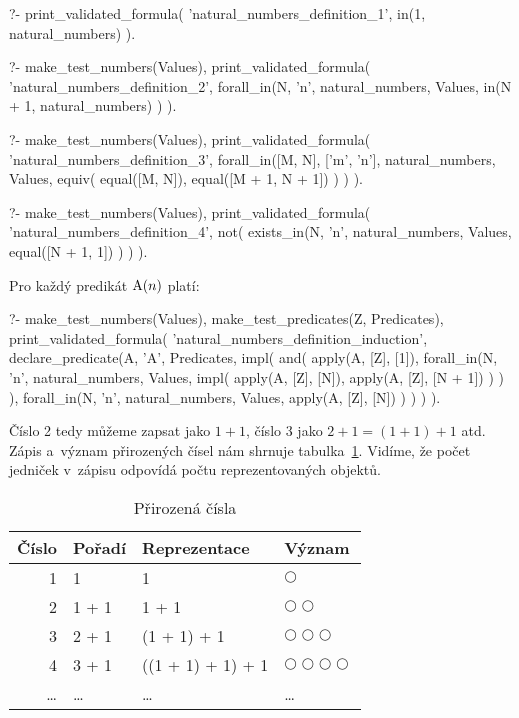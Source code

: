 \begin{fact}
\begin{prolog}
?-	print_validated_formula(
		'natural_numbers_definition_1',
		in(1, natural_numbers)
	).
\end{prolog}
\begin{prolog}
?-	make_test_numbers(Values),
	print_validated_formula(
		'natural_numbers_definition_2',
		forall_in(N, 'n', natural_numbers, Values,
				in(N + 1, natural_numbers)
		)
	).
\end{prolog}
\begin{prolog}
?-	make_test_numbers(Values),
	print_validated_formula(
		'natural_numbers_definition_3',
		forall_in([M, N], ['m', 'n'], natural_numbers, Values,
			equiv(
					equal([M, N]),
					equal([M + 1, N + 1])
			)
		)
	).
\end{prolog}
\begin{prolog}
?-	make_test_numbers(Values),
	print_validated_formula(
		'natural_numbers_definition_4',
		not(
			exists_in(N, 'n', natural_numbers, Values,
				equal([N + 1, 1])
			)
		)
	).
\end{prolog}
Pro každý predikát \(\mathrm{A}(n)\) platí:
\begin{prolog}
?-	make_test_numbers(Values),
	make_test_predicates(Z, Predicates),
	print_validated_formula(
		'natural_numbers_definition_induction',
		declare_predicate(A, 'A', Predicates,
			impl(			
				and(
					apply(A, [Z], [1]),
					forall_in(N, 'n', natural_numbers, Values,
						impl(
							apply(A, [Z], [N]),
							apply(A, [Z], [N + 1])
						)
					)
				),
				forall_in(N, 'n', natural_numbers, Values,
					apply(A, [Z], [N])
				)
			)
		)
	).
\end{prolog}
\end{fact}

Číslo 2 tedy můžeme zapsat jako \(1 + 1\), číslo 3 jako \(2 + 1 = (1 + 1) + 1\) atd. Zápis a~význam přirozených čísel nám shrnuje tabulka~\ref{tab:natural_numbers}. Vidíme, že počet jedniček v~zápisu odpovídá počtu reprezentovaných objektů.

\begin{table}[ht]
\centering
\begin{tabular}{|r|l|l|l|}
\hline
Číslo & Pořadí & Reprezentace & Význam \\
\hline
1 & 1 & 1 & \(\bigcirc\) \\
2 & 1 + 1 & 1 + 1 & \(\bigcirc \bigcirc\) \\
3 & 2 + 1 & (1 + 1) + 1 & \(\bigcirc \bigcirc \bigcirc\) \\
4 & 3 + 1 & ((1 + 1) + 1) + 1 & \(\bigcirc \bigcirc \bigcirc \bigcirc\) \\
\ldots & \ldots & \ldots & \ldots \\
\hline
\end{tabular}
\caption{Přirozená čísla}
\label{tab:natural_numbers}
\end{table}

